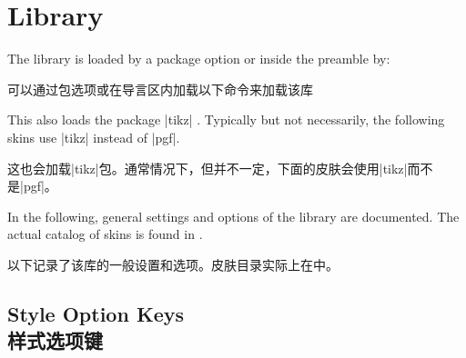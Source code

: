 \section{Library }\label{sec:skins}%
%
The library is loaded by a package option or inside the preamble by:

可以通过包选项或在导言区内加载以下命令来加载该库
\begin{dispListing}
\end{dispListing}
This also loads the package |tikz| \cite{tantau:tikz_and_pgf}. Typically but not necessarily,
the following skins use |tikz| instead of |pgf|.

这也会加载|tikz|包\cite{tantau:tikz_and_pgf}。通常情况下，但并不一定，下面的皮肤会使用|tikz|而不是|pgf|。

In the following, general settings and options of the library are
documented.
The actual catalog of skins is found in .

以下记录了该库的一般设置和选项。皮肤目录实际上在中。

\subsection{Style Option Keys\\样式选项键}\label{subsec:addstyleoptions}
% 









